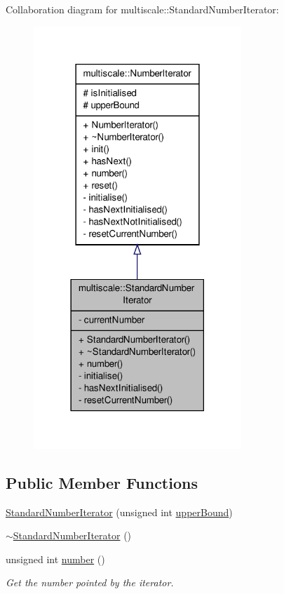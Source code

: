 Collaboration diagram for multiscale\-:\-:Standard\-Number\-Iterator\-:\nopagebreak
\begin{figure}[H]
\begin{center}
\leavevmode
\includegraphics[width=222pt]{classmultiscale_1_1StandardNumberIterator__coll__graph}
\end{center}
\end{figure}
\subsection*{Public Member Functions}
\begin{DoxyCompactItemize}
\item 
\hyperlink{classmultiscale_1_1StandardNumberIterator_a43b7b42ae0ed44a140cf4817cadf9166}{Standard\-Number\-Iterator} (unsigned int \hyperlink{classmultiscale_1_1NumberIterator_a56a5558958778bbde64e249d67cba886}{upper\-Bound})
\item 
\hyperlink{classmultiscale_1_1StandardNumberIterator_aa5b9da824bd014eebab86462f7d08219}{$\sim$\-Standard\-Number\-Iterator} ()
\item 
unsigned int \hyperlink{classmultiscale_1_1StandardNumberIterator_a9071fcd0f94b3520a76ed22faed97353}{number} ()
\begin{DoxyCompactList}\small\item\em Get the number pointed by the iterator. \end{DoxyCompactList}\end{DoxyCompactItemize}

